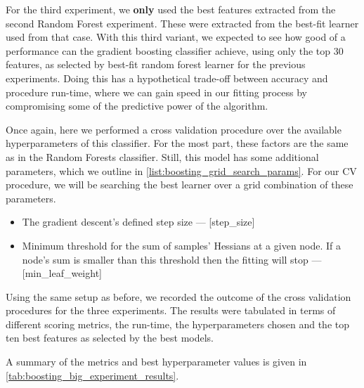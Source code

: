 For the third experiment, we \textbf{only} used the best features extracted from the second Random Forest experiment.
These were extracted from the best-fit learner used from that case.
With this third variant, we expected to see how good of a performance can the gradient boosting classifier achieve, using only the top 30 features, as selected by best-fit random forest learner for the previous experiments.
Doing this has a hypothetical trade-off between accuracy and procedure run-time, where we can gain speed in our fitting process by compromising some of the predictive power of the algorithm.

Once again, here we performed a cross validation procedure over the available hyperparameters of this classifier.
For the most part, these factors are the same as in the Random Forests classifier.
Still, this model has some additional parameters, which we outline in \cref{list:boosting_grid_search_params}.
For our CV procedure, we will be searching the best learner over a grid combination of these parameters.

\begin{itemize}

  \item The gradient descent's defined step size  --- [step\_size]
  \item Minimum threshold for the sum of samples' Hessians at a given node.
  If a node's sum is smaller than this threshold then the fitting will stop  --- [min\_leaf\_weight]
\label{list:boosting_grid_search_params}
\end{itemize}


Using the same setup as before, we recorded the outcome of the cross validation procedures for the three experiments.
The results were tabulated in terms of different scoring metrics, the run-time, the hyperparameters chosen and the top ten best features as selected by the best models.

A summary of the metrics and best hyperparameter values is given in \cref{tab:boosting_big_experiment_results}.

